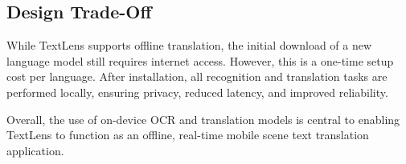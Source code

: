 \subsection{Design Trade-Off}

While TextLens supports offline translation, the initial download of a new language model still requires internet access. However, this is a one-time setup cost per language. After installation, all recognition and translation tasks are performed locally, ensuring privacy, reduced latency, and improved reliability.

Overall, the use of on-device OCR and translation models is central to enabling TextLens to function as an offline, real-time mobile scene text translation application.
